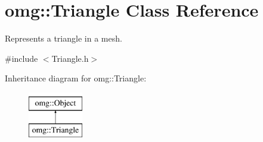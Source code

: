 \hypertarget{classomg_1_1_triangle}{}\section{omg\+::Triangle Class Reference}
\label{classomg_1_1_triangle}


Represents a triangle in a mesh.  




{\ttfamily \#include $<$Triangle.\+h$>$}

Inheritance diagram for omg\+::Triangle\+:\begin{figure}[H]
\begin{center}
\leavevmode
\includegraphics[height=2.000000cm]{classomg_1_1_triangle}
\end{center}
\end{figure}
